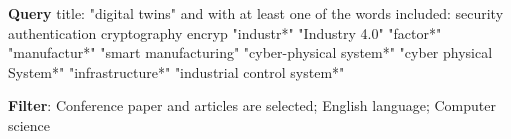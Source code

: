 \begin{tcolorbox}[colback=black!5!white, sharp corners=all, colframe=white!95!black]
\textbf{Query}
 title: "digital twins" and with at least one of the words included: security authentication cryptography encryp "industr*"  "Industry 4.0"  "factor*" "manufactur*" "smart manufacturing"  "cyber-physical system*"  "cyber physical System*"  "infrastructure*" "industrial control system*" 

\tcblower
\textbf{Filter}: Conference paper and articles are selected; English language; Computer science

\end{tcolorbox}
